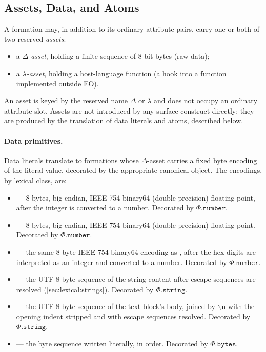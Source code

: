 \subsection{Assets, Data, and Atoms}\label{sec:sem:atoms}

A formation may, in addition to its ordinary attribute pairs, carry one
  or both of two reserved \emph{assets}:
\begin{itemize}
  \item a \emph{$\Delta$-asset}, holding a finite sequence of 8-bit
    bytes (raw data);
  \item a \emph{$\lambda$-asset}, holding a host-language function
    (a hook into a function implemented outside EO).
\end{itemize}
An asset is keyed by the reserved name $\Delta$ or $\lambda$ and does
  not occupy an ordinary attribute slot.
Assets are not introduced by any surface construct directly;
  they are produced by the translation of data literals and atoms,
  described below.

\paragraph{Data primitives.}
Data literals translate to formations whose $\Delta$-asset carries a
  fixed byte encoding of the literal value, decorated by the
  appropriate canonical object.
The encodings, by lexical class, are:

\begin{itemize}
  \item {} --- 8 bytes, big-endian, IEEE-754 binary64
    (double-precision) floating point, after the integer is
    converted to a number.
    Decorated by $\Phi.\mathtt{number}$.
  \item {} --- 8 bytes, big-endian, IEEE-754 binary64
    (double-precision) floating point.
    Decorated by $\Phi.\mathtt{number}$.
  \item {} --- the same 8-byte IEEE-754 binary64
    encoding as , after the hex digits are interpreted as an
    integer and converted to a number.
    Decorated by $\Phi.\mathtt{number}$.
  \item {} --- the UTF-8 byte sequence of the string content
    after escape sequences are resolved (\cref{sec:lexical:strings}).
    Decorated by $\Phi.\mathtt{string}$.
  \item {} --- the UTF-8 byte sequence of the text block's
    body, joined by \(\backslash\)n with the opening indent stripped
    and with escape sequences resolved.
    Decorated by $\Phi.\mathtt{string}$.
  \item {} --- the byte sequence written literally, in order.
    Decorated by $\Phi.\mathtt{bytes}$.
\end{itemize}

